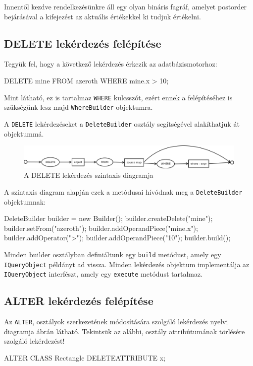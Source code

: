 Innentől kezdve rendelkezésünkre áll egy olyan bináris fagráf, amelyet postorder bejárásával a kifejezést az aktuális értékekkel ki tudjuk értékelni.

\subsection{DELETE lekérdezés felépítése}

Tegyük fel, hogy a következő lekérdezés érkezik az adatbázismotorhoz:
\begin{sql}
DELETE mine FROM azeroth WHERE mine.x > 10;
\end{sql}
Mint látható, ez is tartalmaz \texttt{WHERE} kulcsszót, ezért ennek a felépítéséhez is szükségünk lesz majd \texttt{WhereBuilder} objektumra.

A \texttt{DELETE} lekérdezéseket a \texttt{DeleteBuilder} osztály segítségével alakíthatjuk át objektummá.

\begin{figure}[htb]
	\begin{center}
		\includegraphics[scale=0.4]{images/delete}
		\caption{A DELETE lekérdezés szintaxis diagramja}
		\label{fig:deleteSytnax}
	\end{center}
\end{figure}

A szintaxis diagram alapján ezek a metódusai hívódnak meg a \texttt{DeleteBuilder} objektumnak:

\begin{java}
DeleteBuilder builder = new Builder();
builder.createDelete("mine");
builder.setFrom("azeroth");
builder.addOperandPiece("mine.x");
builder.addOperator(">");
builder.addOperandPiece("10");
builder.build();
\end{java}

Minden builder osztályban definiáltunk egy \texttt{build} metódust, amely egy \texttt{IQueryObject} példányt ad vissza. Minden lekérdezés objektum implementálja az \texttt{IQueryObject} interfészt, amely egy \texttt{execute} metódust tartalmaz.

\subsection{ALTER lekérdezés felépítése}

Az \texttt{ALTER}, osztályok szerkezetének módosítására szolgáló lekérdezés nyelvi diagramja  ábrán látható. Tekintsük az alábbi, osztály attribútumának törlésére szolgáló lekérdezést!
\begin{sql}
ALTER CLASS Rectangle DELETEATTRIBUTE x;
\end{sql}

